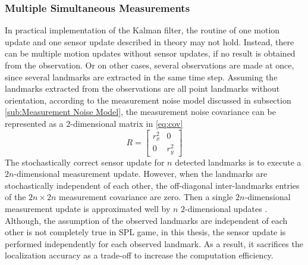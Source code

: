 \subsubsection{Multiple Simultaneous Measurements}
In practical implementation of the Kalman filter, the routine of one motion update and one sensor update described in theory may not hold. Instead, there can be multiple motion updates without sensor updates, if no result is obtained from the observation. Or on other cases, several observations are made at once, since several landmarks are extracted in the same time step. Assuming the landmarks extracted from the observations are all point landmarks without orientation, according to the measurement noise model discussed in subsection \ref{sub:Measurement Noise Model}, the measurement noise covariance can be represented as a 2-dimensional matrix in \autoref{eq:cov}
\begin{equation}
  \label{eq:cov}
  R = 
  \begin{bmatrix}
    r_x^2 & 0 \\ 
    0 & r_y^2
  \end{bmatrix}
\end{equation}
The stochastically correct sensor update for $n$ detected landmarks is to execute a $2n$-dimensional measurement update. However, when the landmarks are stochastically independent of each other, the off-diagonal inter-landmarks entries of the $2n \times 2n$ measurement covariance are zero. Then a single $2n$-dimensional measurement update is approximated well by $n$ $2$-dimensional updates \cite{Tasse2013}. Although, the assumption of the observed landmarks are independent of each other is not completely true in \gls{SPL} game, in this thesis, the sensor update is performed independently for each observed landmark. As a result, it sacrifices the localization accuracy as a trade-off to increase the computation efficiency.


